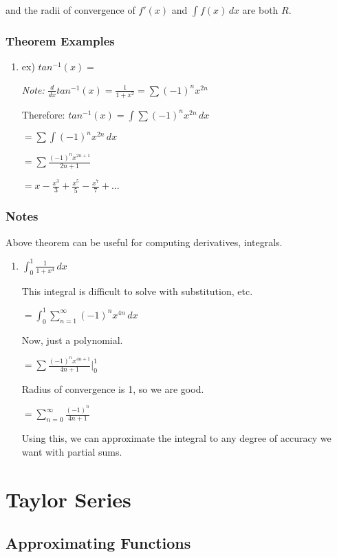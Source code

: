 \documentclass{article}
\begin{document}
and the radii of convergence of $f'(x)$ and $\int f(x) \,dx$ are both $R$.

\subsubsection{Theorem Examples}

\begin{enumerate}
    \item ex) $tan^{-1}(x) = $
    
    \textit{Note:} $\frac{d}{dx} tan^{-1}(x) = \frac{1}{1+x^2} = \sum (-1)^n x^{2n}$
    
    Therefore: $tan^{-1}(x) = \int \sum (-1)^n x^{2n} \,dx$
    
    $=\sum \int (-1)^n x^{2n} \,dx$
    
    $=\sum \frac{(-1)^n x^{2n+1}}{2n+1}$
    
    $= x - \frac{x^3}{3} + \frac{x^5}{5} - \frac{x^7}{7} + ...$
\end{enumerate}

\subsubsection{Notes}

Above theorem can be useful for computing derivatives, integrals.

\begin{enumerate}
    \item $\int_0^1 \frac{1}{1+x^4} \,dx$
    
    This integral is difficult to solve with substitution, etc.
    
    $= \int_0^1 \sum_{n=1}^{\infty} (-1)^n x^{4n} \,dx$
    
    Now, just a polynomial.
    
    $= \sum \frac{(-1)^n x^{4n+1}}{4n+1 } |_0^1$
    
    Radius of convergence is 1, so we are good.
    
    $ = \sum_{n=0}^{\infty} \frac{(-1)^n}{4n+1}$
    
    Using this, we can approximate the integral to any degree of accuracy we want with partial sums.
\end{enumerate}

\section{Taylor Series}

\subsection{Approximating Functions} 
\end{document}
